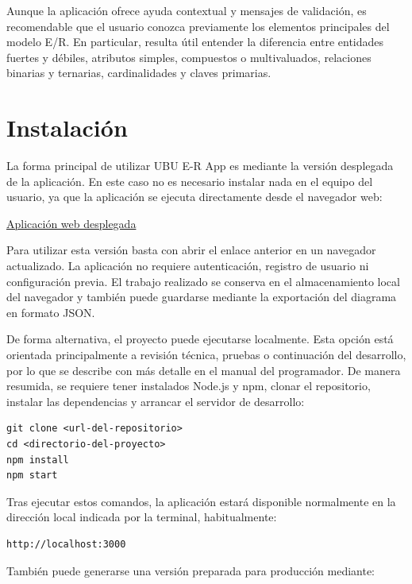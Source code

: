 Aunque la aplicación ofrece ayuda contextual y mensajes de validación, es recomendable que el usuario conozca previamente los elementos principales del modelo E/R. En particular, resulta útil entender la diferencia entre entidades fuertes y débiles, atributos simples, compuestos o multivaluados, relaciones binarias y ternarias, cardinalidades y claves primarias.

\section{Instalación}

La forma principal de utilizar UBU E-R App es mediante la versión desplegada de la aplicación. En este caso no es necesario instalar nada en el equipo del usuario, ya que la aplicación se ejecuta directamente desde el navegador web:

\begin{center}
\href{https://draw-entity-relation-opal.vercel.app/}{Aplicación web desplegada}
\end{center}

Para utilizar esta versión basta con abrir el enlace anterior en un navegador actualizado. La aplicación no requiere autenticación, registro de usuario ni configuración previa. El trabajo realizado se conserva en el almacenamiento local del navegador y también puede guardarse mediante la exportación del diagrama en formato JSON.

De forma alternativa, el proyecto puede ejecutarse localmente. Esta opción está orientada principalmente a revisión técnica, pruebas o continuación del desarrollo, por lo que se describe con más detalle en el manual del programador. De manera resumida, se requiere tener instalados Node.js y npm, clonar el repositorio, instalar las dependencias y arrancar el servidor de desarrollo:

\begin{verbatim}
git clone <url-del-repositorio>
cd <directorio-del-proyecto>
npm install
npm start
\end{verbatim}

Tras ejecutar estos comandos, la aplicación estará disponible normalmente en la dirección local indicada por la terminal, habitualmente:

\begin{verbatim}
http://localhost:3000
\end{verbatim}

También puede generarse una versión preparada para producción mediante:

